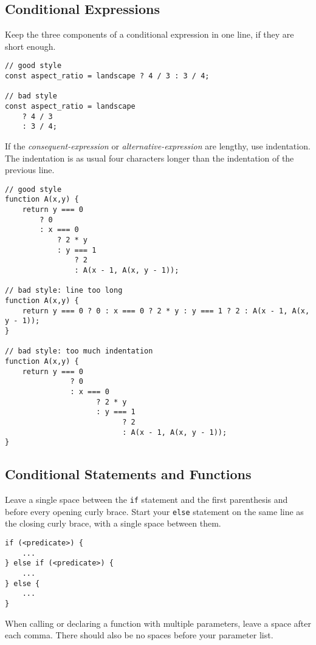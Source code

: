   \subsection*{Conditional Expressions}
\label{condex}
Keep the three components of a conditional expression in one line, if they are short enough.

\begin{lstlisting}
// good style
const aspect_ratio = landscape ? 4 / 3 : 3 / 4;

// bad style
const aspect_ratio = landscape
    ? 4 / 3
    : 3 / 4;
\end{lstlisting}

If the \textit{consequent-expression} or \textit{alternative-expression} are lengthy, use
indentation. The indentation is as usual four characters longer
than the indentation of the previous line.

\begin{lstlisting}
// good style
function A(x,y) {
    return y === 0
        ? 0
        : x === 0
            ? 2 * y
            : y === 1
                ? 2
                : A(x - 1, A(x, y - 1));

// bad style: line too long
function A(x,y) {
    return y === 0 ? 0 : x === 0 ? 2 * y : y === 1 ? 2 : A(x - 1, A(x, y - 1));
}

// bad style: too much indentation
function A(x,y) {
    return y === 0
               ? 0
               : x === 0
                     ? 2 * y
                     : y === 1
                           ? 2
                           : A(x - 1, A(x, y - 1));
}
\end{lstlisting}

  \subsection*{Conditional Statements and Functions}
  Leave a single space between the \lstinline{if} statement and the first parenthesis and before every opening curly brace.
  Start your \lstinline{else} statement on the same line as the closing curly brace, with a single space between them.

\begin{lstlisting}
if (<predicate>) {
    ...
} else if (<predicate>) {
    ...
} else {
    ...
}
\end{lstlisting}

  When calling or declaring a function with multiple parameters, leave a space after each comma.
  There should also be no spaces before your parameter list.

